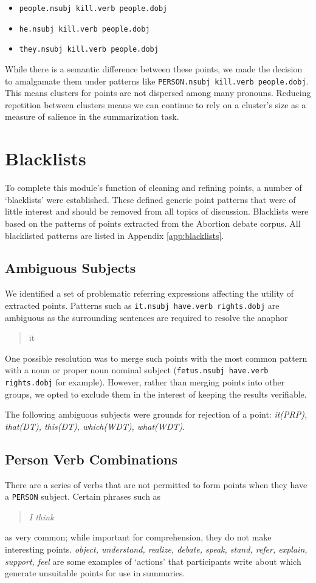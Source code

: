     \begin{itemize}
      \item{\texttt{people.nsubj kill.verb people.dobj}}
      \item{\texttt{he.nsubj kill.verb people.dobj}}
      \item{\texttt{they.nsubj kill.verb people.dobj}}
    \end{itemize}

    While there is a semantic difference between these points, we made the decision to amalgamate them under patterns like \texttt{PERSON.nsubj kill.verb people.dobj}. This means clusters for points are not dispersed among many pronouns. Reducing repetition between clusters means we can continue to rely on a cluster's size as a measure of salience in the summarization task.

  \section{Blacklists}
    To complete this module's function of cleaning and refining points, a number of `blacklists' were established. These defined generic point patterns that were of little interest and should be removed from all topics of discussion. Blacklists were based on the patterns of points extracted from the Abortion debate corpus. All blacklisted patterns are listed in Appendix \ref{app:blacklists}.

    \tocless\subsection{Ambiguous Subjects}
      We identified a set of problematic referring expressions affecting the utility of extracted points. Patterns such as \texttt{it.nsubj have.verb rights.dobj} are ambiguous as the surrounding sentences are required to resolve the anaphor \blockquote{it}. One possible resolution was to merge such points with the most common pattern with a noun or proper noun nominal subject (\texttt{fetus.nsubj have.verb rights.dobj} for example). However, rather than merging points into other groups, we opted to exclude them in the interest of keeping the results verifiable.

      The following ambiguous subjects were grounds for rejection of a point: \textit{it(PRP), that(DT), this(DT), which(WDT), what(WDT)}.

    \tocless\subsection{Person Verb Combinations}
    There are a series of verbs that are not permitted to form points when they have a \texttt{PERSON} subject. Certain phrases such as \blockquote{\textit{I think}} as very common; while important for comprehension, they do not make interesting points. \textit{object, understand, realize, debate, speak, stand, refer, explain, support, feel} are some examples of `actions' that participants write about which generate unsuitable points for use in summaries.

